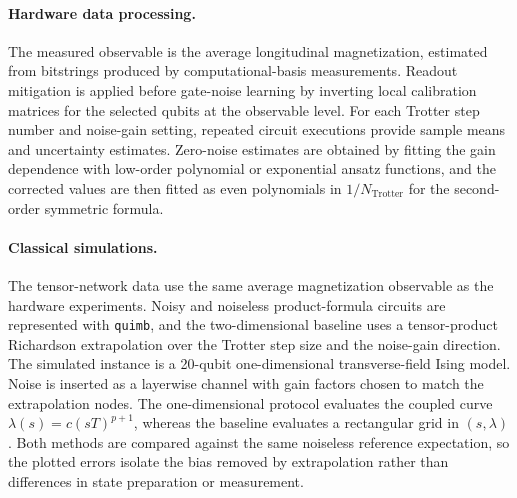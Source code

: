 \documentclass[aps,pra,reprint,superscriptaddress]{revtex4-2}
\begin{document}
\paragraph{Hardware data processing.}
The measured observable is the average longitudinal magnetization, estimated from bitstrings produced by computational-basis measurements.
Readout mitigation is applied before gate-noise learning by inverting local calibration matrices for the selected qubits at the observable level.
For each Trotter step number and noise-gain setting, repeated circuit executions provide sample means and uncertainty estimates.
Zero-noise estimates are obtained by fitting the gain dependence with low-order polynomial or exponential ansatz functions, and the corrected values are then fitted as even polynomials in $1/N_{\mathrm{Trotter}}$ for the second-order symmetric formula.

\paragraph{Classical simulations.}
The tensor-network data use the same average magnetization observable as the hardware experiments.
Noisy and noiseless product-formula circuits are represented with \texttt{quimb}, and the two-dimensional baseline uses a tensor-product Richardson extrapolation over the Trotter step size and the noise-gain direction.
The simulated instance is a 20-qubit one-dimensional transverse-field Ising model.
Noise is inserted as a layerwise channel with gain factors chosen to match the extrapolation nodes.
The one-dimensional protocol evaluates the coupled curve $\lambda(s)=c(sT)^{p+1}$, whereas the baseline evaluates a rectangular grid in $(s,\lambda)$.
Both methods are compared against the same noiseless reference expectation, so the plotted errors isolate the bias removed by extrapolation rather than differences in state preparation or measurement.



\end{document}
